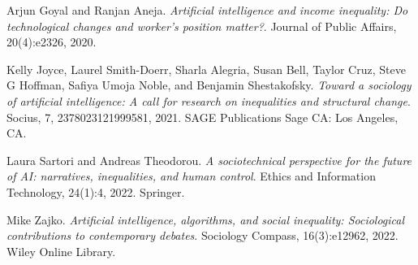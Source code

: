 \documentclass[11pt]{article}
\begin{document}
\begin{thebibliography}{12}
Arjun Goyal and Ranjan Aneja.
\textit{Artificial intelligence and income inequality: Do technological changes and worker's position matter?}.
Journal of Public Affairs, 20(4):e2326, 2020.

Kelly Joyce, Laurel Smith-Doerr, Sharla Alegria, Susan Bell, Taylor Cruz, Steve G Hoffman, Safiya Umoja Noble, and Benjamin Shestakofsky.
\textit{Toward a sociology of artificial intelligence: A call for research on inequalities and structural change}.
Socius, 7, 2378023121999581, 2021.
SAGE Publications Sage CA: Los Angeles, CA.

Laura Sartori and Andreas Theodorou.
\textit{A sociotechnical perspective for the future of AI: narratives, inequalities, and human control}.
Ethics and Information Technology, 24(1):4, 2022.
Springer.

Mike Zajko.
\textit{Artificial intelligence, algorithms, and social inequality: Sociological contributions to contemporary debates}.
Sociology Compass, 16(3):e12962, 2022.
Wiley Online Library.


\end{thebibliography}
\end{document}
